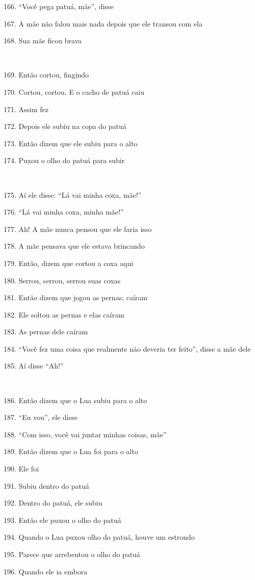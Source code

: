 166. ``Você pega patuá, mãe'', disse

167. A mãe não falou mais nada depois que ele transou com ela

168. Sua mãe ficou brava

~

169. Então cortou, fingindo

170. Cortou, cortou. E o cacho de patuá caiu

171. Assim fez

172. Depois ele subiu na copa do patuá

173. Então dizem que ele subiu para o alto

174. Puxou o olho do patuá para subir

~

175. Aí ele disse: ``Lá vai minha coxa, mãe!''

176. ``Lá vai minha coxa, minha mãe!''

177. Ah! A mãe nunca pensou que ele faria isso

178. A mãe pensava que ele estava brincando

179. Então, dizem que cortou a coxa aqui

180. Serrou, serrou, serrou suas coxas

181. Então dizem que jogou as pernas; caíram

182. Ele soltou as pernas e elas caíram

183. As pernas dele caíram

184. ``Você fez uma coisa que realmente não deveria ter feito'', disse a
mãe dele

185. Aí disse ``Ah!''

~

186. Então dizem que o Lua subiu para o alto

187. ``Eu vou'', ele disse

188. ``Com isso, você vai juntar minhas coisas, mãe''

189. Então dizem que o Lua foi para o alto

190. Ele foi

191. Subiu dentro do patuá

192. Dentro do patuá, ele subiu

193. Então ele puxou o olho do patuá

194. Quando o Lua puxou olho do patuá, houve um estrondo

195. Parece que arrebentou o olho do patuá

196. Quando ele ia embora

